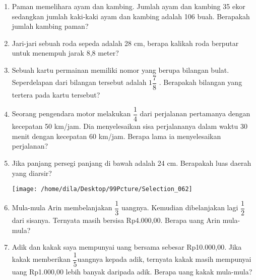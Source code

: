 \documentclass[12pt,a4paper,draft,final,oneside,twoside,openright,openany]{article}
\begin{document}
\begin{enumerate}
	 \item Paman memelihara ayam dan kambing. Jumlah ayam dan kambing 35 ekor sedangkan jumlah kaki-kaki ayam dan kambing adalah 106 buah. Berapakah jumlah kambing paman?
	 \item Jari-jari sebuah roda sepeda adalah 28 cm, berapa kalikah roda berputar untuk menempuh jarak 8,8 meter?
	 \item Sebuah kartu permainan memiliki nomor yang berupa bilangan bulat. Seperdelapan dari bilangan tersebut adalah $1\dfrac{7}{8}$ . Berapakah bilangan yang tertera pada kartu tersebut?
	 
	\item Seorang pengendara motor melakukan $\dfrac{1}{4}$ dari perjalanan pertamanya dengan kecepatan 50 km/jam. Dia menyelesaikan sisa perjalananya dalam waktu 30 menit dengan kecepatan 60 km/jam. Berapa lama ia menyelesaikan perjalanan?
	 
	 \item Jika panjang persegi panjang di bawah adalah 24 cm. Berapakah luas daerah yang diarsir?
	\begin{center}
		\texttt{[image: /home/dila/Desktop/99Pcture/Selection\_062]}
	\end{center}
	 
	 
	 \item Mula-mula Arin membelanjakan $\dfrac{1}{3}$ uangnya. Kemudian dibelanjakan lagi $\dfrac{1}{2}$ dari sisanya. Ternyata masih bersisa Rp4.000,00. Berapa uang Arin mula-mula?
	 \item Adik dan kakak saya mempunyai uang bersama sebesar Rp10.000,00. Jika kakak memberikan $\dfrac{1}{5}$uangnya kepada adik, ternyata kakak masih mempunyai uang Rp1.000,00 lebih banyak daripada adik. Berapa uang kakak mula-mula?
	 \end{enumerate}
	 
\end{document}
